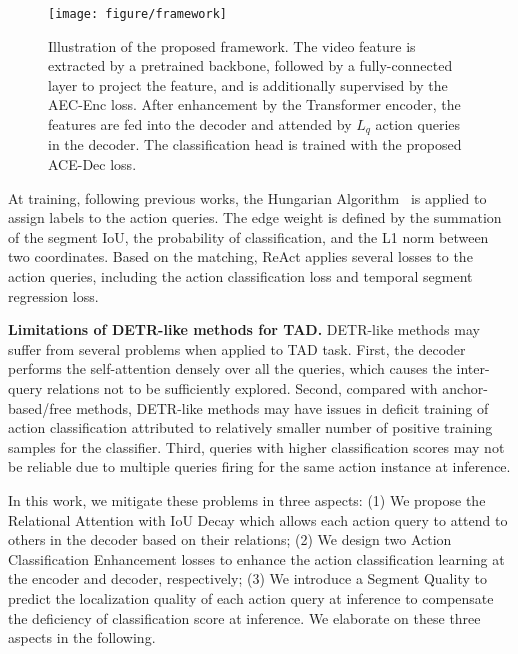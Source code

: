 \documentclass[runningheads]{llncs}
\newcommand{\myPara}[1]{\vspace{.05in}\noindent\textbf{#1}}
\def\name{ReAct }
\def\score{Segment Quality }
\begin{document}
\begin{figure}[t]
    \centering
    \setlength{\abovecaptionskip}{-0.2cm}
    \texttt{[image: figure/framework]}
    \label{framework}
    \caption{Illustration of the proposed framework. The video feature is extracted by a pretrained backbone, followed by a fully-connected layer to project the feature, and is additionally supervised by the AEC-Enc loss. After enhancement by the Transformer encoder, the features are fed into the decoder and attended by $L_q$ action queries in the decoder. The classification head is trained with the proposed ACE-Dec loss.} 
    \vspace{-0.4cm}
\end{figure}




At training, following previous works\cite{carion2020end,zhu2020deformable,liu2021end}, the Hungarian Algorithm~\cite{kuhn1955hungarian} is applied to assign labels to the action queries. The edge weight is defined by the summation of the segment IoU, the probability of classification, and the L1 norm between two coordinates.
Based on the matching, \name applies several losses to the action queries, including the action classification loss and temporal segment regression loss. 







\myPara{Limitations of DETR-like methods for TAD.}
DETR-like methods may suffer from several problems when applied to TAD task. First, the decoder performs the self-attention densely over all the queries, which causes the inter-query relations not to be sufficiently explored. Second, compared with anchor-based/free methods, DETR-like methods may have issues in deficit training of action classification attributed to relatively smaller number of positive training samples for the classifier. Third, queries with higher classification scores may not be reliable due to multiple queries firing for the same action instance at inference. 

In this work, we mitigate these problems in three aspects: (1) We propose the Relational Attention with IoU Decay which allows each action query to attend to others in the decoder based on their relations; (2) We design two Action Classification Enhancement losses to enhance the action classification learning at the encoder and decoder, respectively; (3) We introduce a \score to predict the localization quality of each action query at inference to compensate the deficiency of classification score at inference. We elaborate on these three aspects in the following. 
\end{document}
